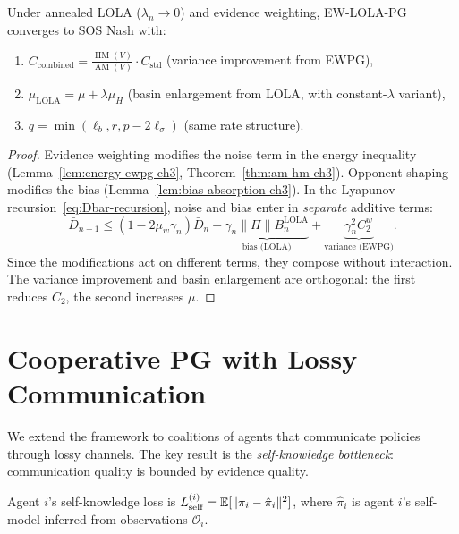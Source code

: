 \begin{theorem}
\label{thm:combined-ch3}
Under annealed LOLA ($\lambda_n \to 0$) and evidence weighting, EW-LOLA-PG converges to SOS Nash with:
\begin{enumerate}[label=(\roman*)]
    \item $C_{\mathrm{combined}} = \frac{\operatorname{HM}(V)}{\operatorname{AM}(V)} \cdot C_{\mathrm{std}}$ \quad (variance improvement from EWPG),
    \item $\mu_{\mathrm{LOLA}} = \mu + \lambda \mu_H$ \quad (basin enlargement from LOLA, with constant-$\lambda$ variant),
    \item $q = \min(\ell_b, r, p - 2\ell_\sigma)$ \quad (same rate structure).
\end{enumerate}
\end{theorem}

\begin{proof}
Evidence weighting modifies the noise term in the energy inequality (Lemma~\ref{lem:energy-ewpg-ch3}, Theorem~\ref{thm:am-hm-ch3}). Opponent shaping modifies the bias (Lemma~\ref{lem:bias-absorption-ch3}). In the Lyapunov recursion~\eqref{eq:Dbar-recursion}, noise and bias enter in \emph{separate} additive terms:
\[
    \bar{D}_{n+1} \leq (1 - 2\mu_w \gamma_n)\bar{D}_n + \underbrace{\gamma_n \|\Pi\| B_n^{\mathrm{LOLA}}}_{\text{bias (LOLA)}} + \underbrace{\gamma_n^2 C_2^w}_{\text{variance (EWPG)}}.
\]
Since the modifications act on different terms, they compose without interaction. The variance improvement and basin enlargement are orthogonal: the first reduces $C_2$, the second increases $\mu$.
\end{proof}


\section{Cooperative PG with Lossy Communication}
\label{sec:cooperative}

We extend the framework to coalitions of agents that communicate policies through lossy channels. The key result is the \emph{self-knowledge bottleneck}: communication quality is bounded by evidence quality.

\begin{definition}
\label{def:self-knowledge}
Agent $i$'s self-knowledge loss is $L_{\text{self}}^{(i)} = \mathbb{E}[\|\pi_i - \hat{\pi}_i\|^2]$, where $\hat{\pi}_i$ is agent $i$'s self-model inferred from observations $\mathcal{O}_i$.
\end{definition}

